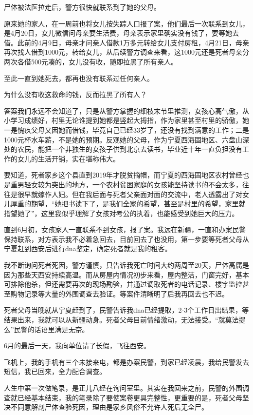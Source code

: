 尸体被法医拉走后，警方很快就联系到了她的父母。

原来她的家人，在一周前也将女儿按失踪人口报了案，他们最后一次联系到女儿，是4月20日，女儿微信问母亲要生活费，母亲表示家里确实没有钱了，要等她去借。此前的4月9日，母亲才问亲人借款1万多元转给女儿支付房租，4月21日，母亲再次找人借到1000元，转给女儿，从后续警方调查来看，这1000元还是死者母亲分两次各借500元凑的，女儿没有收，随即拉黑了所有亲人。

至此一直到她死去，都再也没有联系过任何亲人。

为什么没有收这救命的钱，反而拉黑了所有人？

答案我们永远不会知道了，只是从警方掌握的细枝末节里推测，女孩心高气傲，从小学习成绩好，村里无论谁提到她都是竖起大拇指，作为家里甚至村里的骄傲，她一是愧疚父母又因她而借钱，毕竟自己已经33岁了，还没有找到满意的工作；二是1000元杯水车薪，不是她的预期。反观她的父母，作为宁夏西海固地区、六盘山深处的农民，能把一个非独生的女孩子供到北京去读书，毕业近十年一直负担没有工作的女儿的生活开销，实在堪称伟大。

要知道，死者家乡这个县直到2019年才脱贫摘帽，而宁夏的西海固地区农村曾经也是重男轻女较为突出的地方，一个农村贫困家庭的女孩能坚持读书的不会太多，往往是很早就嫁作人妇。但在我后面与死者父亲面对面的交流中，老人透露出了对女儿厚重的期望，“她把书读下了，是我们全家的希望，甚至是村里的希望，家里就指望她了”，这里我似乎理解了女孩对考公的执着，也能感受到她巨大的压力。

直到6月初，女孩家人一直联系不到女孩，报了案。我远在新疆，一直和办案民警保持联系，对方表示我不必着急回去，目前回去了也没用，第一步要等死者父母从宁夏赶到西安后进行dna鉴定，确定死者就是我的租客。

我不断询问死者死因，警方谨慎，只告诉我死亡时间大约两周至20天，尸体高腐是因为那些天西安持续高温。而从房屋内情况初步来看，屋内整洁，门窗完好，基本可排除他杀，但还需要再次的现场勘验，并通过调取死者的电话记录、楼宇监控甚至购物记录等大量的外围调查去验证。等案件清晰明了后我再回去也不迟。

死者父母当晚就从宁夏赶到了，民警告诉我dna已经提取，2-3个工作日出结果，等结果出来，我就可以从新疆动身。死者父母目前情绪激动，无法接受。“就莫法提么”民警的话语里满是无奈。

6月的最后一天，我向单位请了长假，飞往西安。

飞机上，我的手机有三个未接来电，都是办案民警，到家已经凌晨，我给民警发去短信，我已回来，全力配合调查。

人生中第一次做笔录，是正儿八经在询问室里。其实在我回来之前，民警的外围调查就已经基本结束，我的笔录除了要使案卷更具完整性，更重要的是，死者父母坚决不同意解剖尸体查验死因，理由是家乡风俗不允许人死后无全尸。


